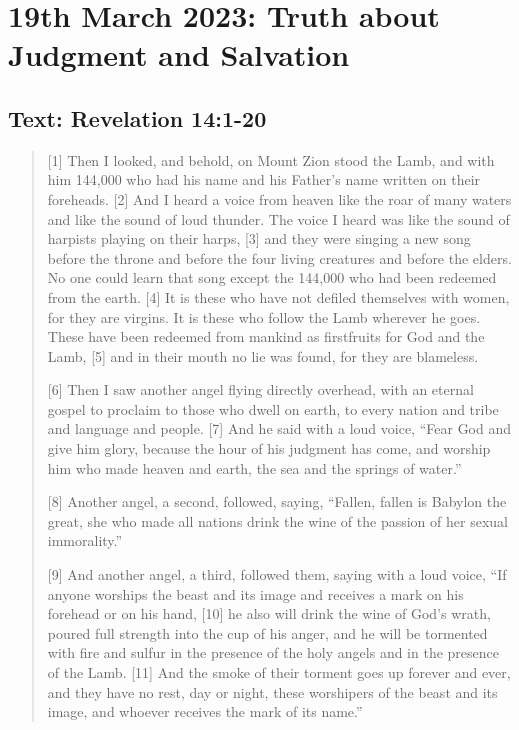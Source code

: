 \setcounter{figure}{0}
\section{19th March 2023: Truth about Judgment and Salvation}
\subsection*{Text: Revelation 14:1-20}
  \begin{quote}
    [1] Then I looked, and behold, on Mount Zion stood the Lamb, and with him
    144,000 who had his name and his Father’s name written on their
    foreheads.  [2] And I heard a voice from heaven like the roar of many
    waters and like the sound of loud thunder.  The voice I heard was like
    the sound of harpists playing on their harps, [3] and they were singing a
    new song before the throne and before the four living creatures and
    before the elders.  No one could learn that song except the 144,000 who
    had been redeemed from the earth.  [4] It is these who have not defiled
    themselves with women, for they are virgins.  It is these who follow the
    Lamb wherever he goes.  These have been redeemed from mankind as
    firstfruits for God and the Lamb, [5] and in their mouth no lie was
    found, for they are blameless.

    [6] Then I saw another angel flying directly overhead, with an eternal
    gospel to proclaim to those who dwell on earth, to every nation and tribe
    and language and people.  [7] And he said with a loud voice, “Fear God
    and give him glory, because the hour of his judgment has come, and
    worship him who made heaven and earth, the sea and the springs of water.”

    [8] Another angel, a second, followed, saying, “Fallen, fallen is Babylon
    the great, she who made all nations drink the wine of the passion of her
    sexual immorality.”

    [9] And another angel, a third, followed them, saying with a loud voice,
    “If anyone worships the beast and its image and receives a mark on his
    forehead or on his hand, [10] he also will drink the wine of God’s wrath,
    poured full strength into the cup of his anger, and he will be tormented
    with fire and sulfur in the presence of the holy angels and in the
    presence of the Lamb.  [11] And the smoke of their torment goes up
    forever and ever, and they have no rest, day or night, these worshipers
    of the beast and its image, and whoever receives the mark of its name.”


\end{quote}
